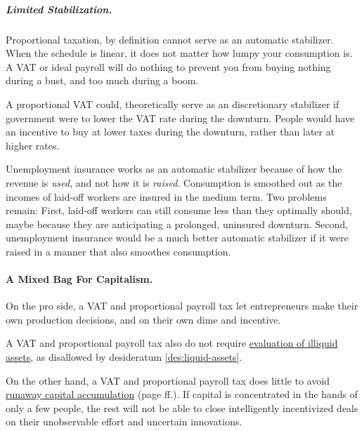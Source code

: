 \subparagraph{Limited Stabilization.}
Proportional taxation, by definition cannot serve as an automatic stabilizer.
When the schedule is linear, it does not matter how lumpy your consumption is.
A VAT or ideal payroll will do nothing to prevent you from buying nothing during a bust, and too much during a boom.

A proportional VAT could, theoretically serve as an discretionary stabilizer if government were to lower the VAT rate during the downturn.
People would have an incentive to buy at lower taxes during the downturn, rather than later at higher rates.

Unemployment insurance works as an automatic stabilizer because of how the revenue is \emph{used}, and not how it is \emph{raised}.
Consumption is smoothed out as the incomes of laid-off workers are insured in the medium term.
Two problems remain:
First, laid-off workers can still consume less than they optimally should, maybe because they are anticipating a prolonged, uninsured downturn.
Second, unemployment insurance would be a much better automatic stabilizer if it were raised in a manner that also smoothes consumption.

\paragraph{A Mixed Bag For Capitalism.}
On the pro side, a VAT and proportional payroll tax let entrepreneurs make their own production decisions, and on their own dime and incentive.

A VAT and proportional payroll tax also do not require \hyperref[des:liquid-assets]{evaluation of illiquid assets}, as disallowed by desideratum \ref{des:liquid-assets}.

On the other hand, a VAT and proportional payroll tax does little to avoid \hyperref[sec:inequality-dynamics]{runaway capital accumulation} (page \pageref{sec:inequality-dynamics}ff.).
If capital is concentrated in the hands of only a few people, the rest will not be able to close intelligently incentivized deals on their unobservable effort and uncertain innovations.

